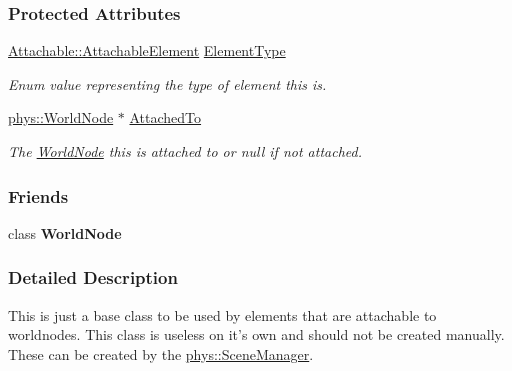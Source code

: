 \subsubsection*{Protected Attributes}
\begin{DoxyCompactItemize}
\item 
\hyperlink{classphys_1_1Attachable_acd1fca033e7cc0bb3024a92d466d213a}{Attachable::AttachableElement} \hyperlink{classphys_1_1Attachable_af574d5f08a304c6e0ae002bb2fc057c7}{ElementType}
\begin{DoxyCompactList}\small\item\em Enum value representing the type of element this is. \item\end{DoxyCompactList}\item 
\hypertarget{classphys_1_1Attachable_ac781addd4313b292b7f6bf87015286fd}{
\hyperlink{classphys_1_1WorldNode}{phys::WorldNode} $\ast$ \hyperlink{classphys_1_1Attachable_ac781addd4313b292b7f6bf87015286fd}{AttachedTo}}
\label{df/dbd/classphys_1_1Attachable_ac781addd4313b292b7f6bf87015286fd}

\begin{DoxyCompactList}\small\item\em The \hyperlink{classphys_1_1WorldNode}{WorldNode} this is attached to or null if not attached. \item\end{DoxyCompactList}\end{DoxyCompactItemize}
\subsubsection*{Friends}
\begin{DoxyCompactItemize}
\item 
\hypertarget{classphys_1_1Attachable_a1cacd07efb11226da49a7c80569b18e8}{
class {\bfseries WorldNode}}
\label{df/dbd/classphys_1_1Attachable_a1cacd07efb11226da49a7c80569b18e8}

\end{DoxyCompactItemize}


\subsubsection{Detailed Description}
This is just a base class to be used by elements that are attachable to worldnodes. This class is useless on it's own and should not be created manually. These can be created by the \hyperlink{classphys_1_1SceneManager}{phys::SceneManager}. 

